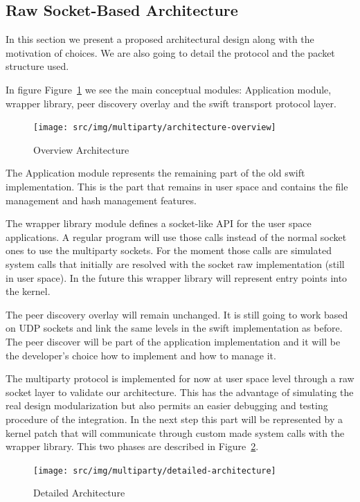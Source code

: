 \subsection{Raw Socket-Based Architecture}

In this section we present a proposed architectural design along with the
motivation of choices. We are also going to detail the protocol and the packet
structure used.

In figure Figure~\ref{fig:multiparty:architecture-overview} we see the main
conceptual modules: Application module, wrapper library, peer discovery
overlay and the swift transport protocol layer.

\begin{figure}
  \centering
  \texttt{[image: src/img/multiparty/architecture-overview]}
  \caption{Overview Architecture}
  \label{fig:multiparty:architecture-overview}
\end{figure}

The Application module represents the remaining part of the old swift
implementation. This is the part that remains in user space and contains the
file management and hash management features. 

The wrapper library module defines a socket-like API for the user space
applications. A regular program will use those calls instead of the normal
socket ones to use the multiparty sockets. For the moment those calls are
simulated system calls that initially are resolved with the socket raw
implementation (still in user space). In the future this wrapper library
will represent entry points into the kernel.

The peer discovery overlay will remain unchanged. It is still going to work
based on UDP sockets and link the same levels in the swift implementation as
before. The peer discover will be part of the application implementation and
it will be the developer's choice how to implement and how to manage it.

The multiparty protocol is implemented for now at user space level through a raw
socket layer to validate our architecture. This has the advantage of
simulating the real design modularization but also permits an easier debugging
and testing procedure of the integration. In the next step this part will be
represented by a kernel patch that will communicate through custom made system
calls with the wrapper library. This two phases are described in
Figure~\ref{fig:multiparty:detailed-architecture}.

\begin{figure}
  \centering
  \texttt{[image: src/img/multiparty/detailed-architecture]}
  \caption{Detailed Architecture}
  \label{fig:multiparty:detailed-architecture}
\end{figure}

